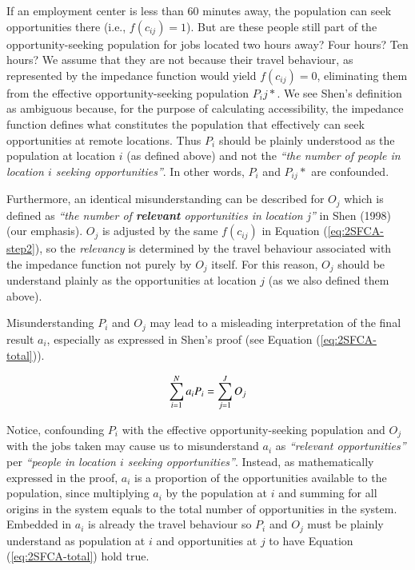 \documentclass[]{elsarticle} %
\begin{document}
If an employment center is less than 60 minutes away, the population can
seek opportunities there (i.e., \(f(c_{ij})=1\)). But are these people
still part of the opportunity-seeking population for jobs located two
hours away? Four hours? Ten hours? We assume that they are not because
their travel behaviour, as represented by the impedance function would
yield \(f(c_{ij})=0\), eliminating them from the effective
opportunity-seeking population \(P_ij*\). We see Shen's definition as
ambiguous because, for the purpose of calculating accessibility, the
impedance function defines what constitutes the population that
effectively can seek opportunities at remote locations. Thus \(P_i\)
should be plainly understood as the population at location \(i\) (as
defined above) and not the \emph{``the number of people in location
\(i\) seeking opportunities''}. In other words, \(P_i\) and \(P_{ij}*\)
are confounded.

Furthermore, an identical misunderstanding can be described for \(O_j\)
which is defined as \emph{``the number of \textbf{relevant}
opportunities in location j''} in Shen (1998) (our emphasis). \(O_j\) is
adjusted by the same \(f(c_{ij})\) in Equation (\ref{eq:2SFCA-step2}),
so the \emph{relevancy} is determined by the travel behaviour associated
with the impedance function not purely by \(O_j\) itself. For this
reason, \(O_j\) should be understand plainly as the opportunities at
location \(j\) (as we also defined them above).

Misunderstanding \(P_i\) and \(O_j\) may lead to a misleading
interpretation of the final result \(a_i\), especially as expressed in
Shen's proof (see Equation (\ref{eq:2SFCA-total})).

\begin{equation}
\label{eq:2SFCA-total}
\sum_{i=1}^N a_{i} P_i= \sum_{j=1}^JO_j\\
\end{equation}

Notice, confounding \(P_i\) with the effective opportunity-seeking
population and \(O_j\) with the jobs taken may cause us to misunderstand
\(a_{i}\) as \emph{``relevant opportunities''} per \emph{``people in
location \(i\) seeking opportunities''}. Instead, as mathematically
expressed in the proof, \(a_{i}\) is a proportion of the opportunities
available to the population, since multiplying \(a_i\) by the population
at \(i\) and summing for all origins in the system equals to the total
number of opportunities in the system. Embedded in \(a_i\) is already
the travel behaviour so \(P_i\) and \(O_j\) must be plainly understand
as population at \(i\) and opportunities at \(j\) to have Equation
(\ref{eq:2SFCA-total}) hold true.
\end{document}
